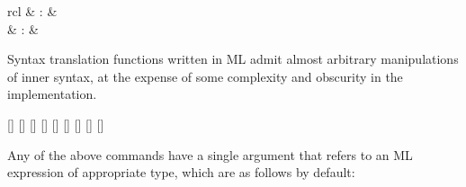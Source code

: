 \begin{isabellebody}
\begin{isamarkuptext}
\begin{matharray}{rcl}
    \hypertarget{command.typed-print-translation}{\hyperlink{command.typed-print-translation}{\mbox{}}} & : &  \\
    \hypertarget{command.print-ast-translation}{\hyperlink{command.print-ast-translation}{\mbox{}}} & : &  \\
  \end{matharray}

  Syntax translation functions written in ML admit almost arbitrary
  manipulations of inner syntax, at the expense of some complexity and
  obscurity in the implementation.

  \begin{railoutput}
\rail@bar
{}[]
[]
[]
[]
[]
\rail@endbar
\rail@bar
{}
[]
[]
[]
\rail@endbar
{}[]
\rail@end
\end{railoutput}


  Any of the above commands have a single \hyperlink{syntax.text}{\mbox{}} argument that
  refers to an ML expression of appropriate type, which are as follows
  by default:


\end{isamarkuptext}
\end{isabellebody}
